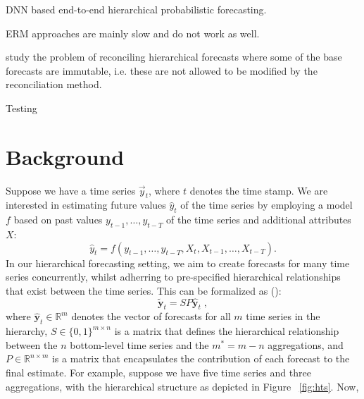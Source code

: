 \documentclass{article}
\begin{document}
  \cite{rangapuram_endtoend_2021} DNN based end-to-end hierarchical probabilistic forecasting.

  \cite{bentaieb_regularized_2019} ERM approaches are mainly slow and do not work as well.

  \cite{taieb_sparse_2017}

  \cite{zhang_optimal_2022} study the problem of reconciling hierarchical forecasts where some of the base forecasts are immutable, i.e. these are not allowed to be modified by the reconciliation method. 

  Testing
  

\section{Background}
  \label{sec:background}
  Suppose we have a time series \(\vec{y}_t\), where \(t\) denotes the time stamp. We are interested in estimating future values \(\hat{y}_{t}\) of the time series by employing a model \(f\) based on past values \(y_{t-1}, \dots, y_{t-T}\) of the time series and additional attributes \(X\):
  \begin{equation}
    \hat{y}_{t} = f(y_{t-1}, \dots, y_{t-T}, X_{t}, X_{t-1}, \dots, X_{t-T}).
  \end{equation}
  In our hierarchical forecasting setting, we aim to create forecasts for many time series concurrently, whilst adherring to pre-specified hierarchical relationships that exist between the time series. This can be formalized as (\cite{hyndman_forecasting_2021}):
  \begin{equation} \label{eq:hfp}
    \tilde{\textbf{y}}_{t} = SP\hat{\textbf{y}}_{t} \;,
  \end{equation}
  where \(\hat{\textbf{y}}_{t} \in \mathbb{R}^{m} \) denotes the vector of forecasts for all \(m\) time series in the hierarchy, \(S \in \{0, 1\}^{m \times n}\) is a matrix that defines the hierarchical relationship between the \(n\) bottom-level time series and the \(m^* = m - n\) aggregations, and \(P \in \mathbb{R}^{n \times m}\) is a matrix that encapsulates the contribution of each forecast to the final estimate. For example, suppose we have five time series and three aggregations, with the hierarchical structure as depicted in Figure~
  \ref{fig:hts}. Now,
\end{document}
